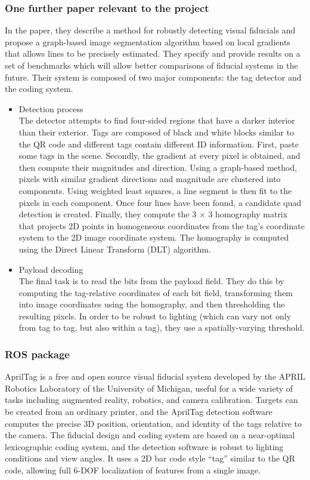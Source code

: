 \documentclass[12pt,draftclsnofoot,onecolumn]{IEEEtran}
\begin{document}
	\subsubsection{One further paper relevant to the project}
	In the paper\cite{olson2011apriltag}, they describe a method for robustly detecting visual fiducials and propose a graph-based image segmentation algorithm based on local gradients that allows lines to be precisely estimated. They specify and provide results on a set of benchmarks which will allow better comparisons of fiducial systems in the future. Their system is composed of two major components: the tag detector and the coding system.  
	\begin{itemize}
		\item Detection process\\
		The detector attempts to find four-sided regions that have a darker interior than their exterior. Tags are composed of black and white blocks similar to the QR code and different tags contain different ID information. First, paste some tags in the scene. Secondly, the gradient at every pixel is obtained, and then compute their magnitudes and direction. Using a graph-based method, pixels with similar gradient directions and magnitude are clustered into components. Using weighted least squares, a line segment is then fit to the pixels in each component. Once four lines have been found, a candidate quad detection is created. Finally, they compute the 3 $\times$ 3 homography matrix that projects 2D points in homogeneous coordinates from the tag’s coordinate system to the 2D image coordinate system. The homography is computed using the Direct Linear Transform (DLT) algorithm.
		\item Payload decoding\\ 
		The final task is to read the bits from the payload field. They do this by computing the tag-relative coordinates of each bit field, transforming them into image coordinates using the homography, and then thresholding the resulting pixels. In order to be robust to lighting (which can vary not only from tag to tag, but also within a tag), they use a spatially-varying threshold.
	\end{itemize}
	
	\subsubsection{ROS package}
	AprilTag is a free and open source visual fiducial system developed by the APRIL Robotics Laboratory of the University of Michigan, useful for a wide variety of tasks including augmented reality, robotics, and camera calibration. Targets can be created from an ordinary printer, and the AprilTag detection software computes the precise 3D position, orientation, and identity of the tags relative to the camera. The fiducial design and coding system are based on a near-optimal lexicographic coding system, and the detection software is robust to lighting conditions and view angles. 
	It uses a 2D bar code style “tag” similar to the QR code, allowing full 6-DOF localization of features from a single image.
	
\end{document}

